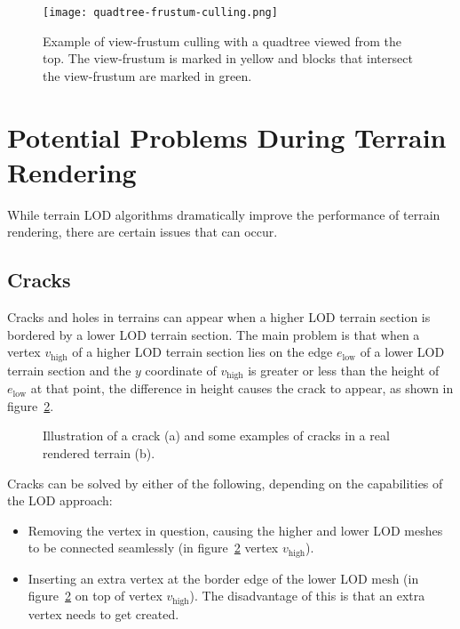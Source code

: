 \begin{figure}[H]
  \centering
  \texttt{[image: quadtree-frustum-culling.png]}
  \caption{Example of view-frustum culling with a quadtree viewed from the top. The view-frustum is marked in yellow and blocks that intersect the view-frustum are marked in green.}\label{fig:quadtree-frustum-culling}
\end{figure}

\section{Potential Problems During Terrain Rendering}
While terrain LOD algorithms dramatically improve the performance of terrain rendering, 
there are certain issues that can occur. 

\subsection{Cracks}
Cracks and holes in terrains can appear when a higher LOD terrain section is bordered 
by a lower LOD terrain section. The main problem is that when a vertex $v_{\text{high}}$ of a higher LOD terrain section lies on the edge $e_{\text{low}}$
of a lower LOD terrain section and the $y$ coordinate of $v_{\text{high}}$ is greater or less than the 
height of $e_{\text{low}}$ at that point, the difference in height causes the crack to appear, as shown in figure~\ref{fig:crack-example}.
\begin{figure}[H]
  \centering
  \qquad
  \caption{Illustration of a crack (a) and some examples of cracks in a real rendered terrain (b).}\label{fig:crack-example}
\end{figure}
Cracks can be solved by either of the following, depending on the capabilities of the LOD approach:
\begin{itemize}
  \item Removing the vertex in question, causing the higher and lower LOD meshes to be connected seamlessly (in figure~\ref{fig:crack-example} vertex $v_{\text{high}}$).
  \item Inserting an extra vertex at the border edge of the lower LOD mesh \cite[p.~194]{lodfor3dgraphics} (in figure~\ref{fig:crack-example} on top of vertex $v_{\text{high}}$). The disadvantage of this is that an extra vertex needs to get created.
\end{itemize}

